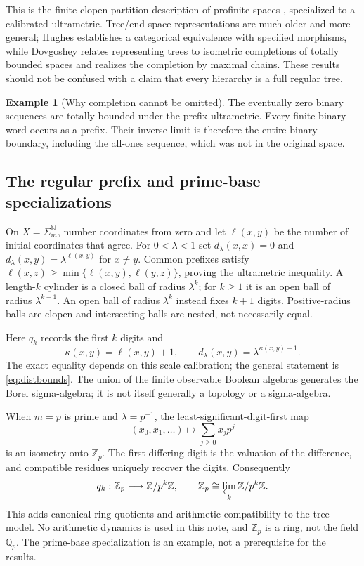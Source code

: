 \documentclass[11pt]{article}
\theoremstyle{definition}
\newtheorem{example}[theorem]{Example}
\theoremstyle{remark}
\newcommand{\N}{\mathbb N}
\newcommand{\Z}{\mathbb Z}
\begin{document}
This is the finite clopen partition description of profinite spaces \cite[Lemma 5.22.2]{Stacks}, specialized to a calibrated ultrametric. Tree/end-space representations are much older and more general; Hughes \cite{Hughes2004} establishes a categorical equivalence with specified morphisms, while Dovgoshey \cite[Theorem 10.25 and Proposition 10.29]{Dovgoshey2025} relates representing trees to isometric completions of totally bounded spaces and realizes the completion by maximal chains. These results should not be confused with a claim that every hierarchy is a full regular tree.

\begin{example}[Why completion cannot be omitted]
The eventually zero binary sequences are totally bounded under the prefix ultrametric. Every finite binary word occurs as a prefix. Their inverse limit is therefore the entire binary boundary, including the all-ones sequence, which was not in the original space.
\end{example}

\subsection{The regular prefix and prime-base specializations}
On $X=\Sigma_m^{\N}$, number coordinates from zero and let $\ell(x,y)$ be the number of initial coordinates that agree. For $0<\lambda<1$ set $d_\lambda(x,x)=0$ and $d_\lambda(x,y)=\lambda^{\ell(x,y)}$ for $x\ne y$. Common prefixes satisfy
$\ell(x,z)\geq\min\{\ell(x,y),\ell(y,z)\}$, proving the ultrametric inequality.
A length-$k$ cylinder is a closed ball of radius $\lambda^k$; for $k\geq1$ it is an open ball of radius $\lambda^{k-1}$. An open ball of radius $\lambda^k$ instead fixes $k+1$ digits. Positive-radius balls are clopen and intersecting balls are nested, not necessarily equal.

Here $q_k$ records the first $k$ digits and
\[
 \kappa(x,y)=\ell(x,y)+1,\qquad
 d_\lambda(x,y)=\lambda^{\kappa(x,y)-1}.
\]
The exact equality depends on this scale calibration; the general statement is \eqref{eq:distbounds}. The union of the finite observable Boolean algebras generates the Borel sigma-algebra; it is not itself generally a topology or a sigma-algebra.

When $m=p$ is prime and $\lambda=p^{-1}$, the least-significant-digit-first map
\[
 (x_0,x_1,\ldots)\longmapsto\sum_{j\geq0}x_jp^j
\]
is an isometry onto $\Z_p$. The first differing digit is the valuation of the difference, and compatible residues uniquely recover the digits. Consequently
\[
 q_k:\Z_p\longrightarrow\Z/p^k\Z,
 \qquad \Z_p\cong\varprojlim_k\Z/p^k\Z.
\]
This adds canonical ring quotients and arithmetic compatibility to the tree model. No arithmetic dynamics is used in this note, and $\Z_p$ is a ring, not the field $\mathbb Q_p$. The prime-base specialization is an example, not a prerequisite for the results.
\end{document}
